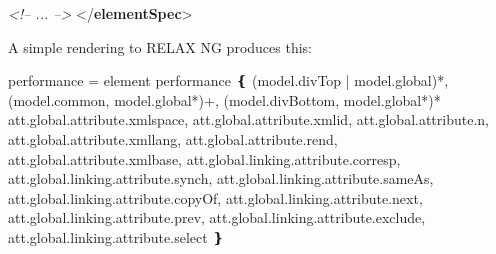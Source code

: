 \begin{shaded}
\hspace*{1em}\hspace*{1em}\mbox{}\newline 
\hspace*{1em}\mbox{}\newline 
{}\mbox{}\newline 
\textit{<!-- ... -->}\mbox{}\newline 
{</\textbf{elementSpec}>}\end{shaded}\egroup\par \noindent  A simple rendering to RELAX NG produces this: \par\hfill\bgroup\exampleFont\vskip 10pt\begin{shaded}
\obeyspaces performance =\newline
 element performance ❴ \newline
  (model.divTop | model.global)*,\newline
  (model.common, model.global*)+,\newline
  (model.divBottom, model.global*)*\newline
  att.global.attribute.xmlspace,\newline
  att.global.attribute.xmlid,\newline
  att.global.attribute.n,\newline
  att.global.attribute.xmllang,\newline
  att.global.attribute.rend,\newline
  att.global.attribute.xmlbase,\newline
  att.global.linking.attribute.corresp,\newline
  att.global.linking.attribute.synch,\newline
  att.global.linking.attribute.sameAs,\newline
  att.global.linking.attribute.copyOf,\newline
  att.global.linking.attribute.next,\newline
  att.global.linking.attribute.prev,\newline
  att.global.linking.attribute.exclude,\newline
  att.global.linking.attribute.select\newline
❵\end{shaded}
\par\egroup 
